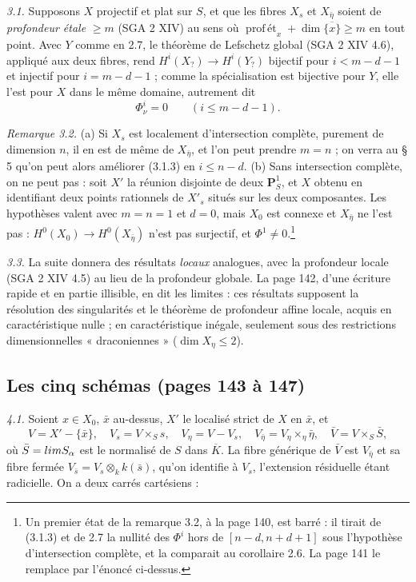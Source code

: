 \documentclass[11pt,a4paper]{article}
\begin{document}
\emph{3.1.} Supposons $X$ projectif et plat sur $S$, et que les fibres $X_s$ et
$X_{\bar\eta}$ soient de \emph{profondeur étale} $\geq m$ (SGA 2 XIV) au sens où
$\operatorname{prof\,ét}_x + \dim \overline{\{x\}} \geq m$ en tout point. Avec $Y$
comme en 2.7, le théorème de Lefschetz global (SGA 2 XIV 4.6), appliqué aux deux
fibres, rend $H^i(X_?) \to H^i(Y_?)$ bijectif pour $i < m - d - 1$ et injectif
pour $i = m - d - 1$ ; comme la spécialisation est bijective pour $Y$, elle
l'est pour $X$ dans le même domaine, autrement dit
\[
  \Phi^i_\nu = 0 \qquad (i \leq m - d - 1) . \tag{3.1.3}
\]

\emph{Remarque 3.2.} (a) Si $X_s$ est localement d'intersection complète,
purement de dimension $n$, il en est de même de $X_{\bar\eta}$, et l'on peut
prendre $m = n$ ; on verra au § 5 qu'on peut alors améliorer (3.1.3) en
$i \leq n - d$. (b) Sans intersection complète, on ne peut pas : soit $X'$ la
réunion disjointe de deux $\mathbf{P}^1_S$, et $X$ obtenu en identifiant deux
points rationnels de $X'_s$ situés sur les deux composantes. Les hypothèses
valent avec $m = n = 1$ et $d = 0$, mais $X_0$ est connexe et $X_{\bar\eta}$ ne
l'est pas : $H^0(X_0) \to H^0(X_{\bar\eta})$ n'est pas surjectif, et
$\Phi^1 \neq 0$.\footnote{Un premier état de la remarque 3.2, à la page 140, est
barré : il tirait de (3.1.3) et de 2.7 la nullité des $\Phi^i$ hors de
$[n-d, n+d+1]$ sous l'hypothèse d'intersection complète, et la comparait au
corollaire 2.6. La page 141 le remplace par l'énoncé ci-dessus.}

\emph{3.3.} La suite donnera des résultats \emph{locaux} analogues, avec la
profondeur locale (SGA 2 XIV 4.5) au lieu de la profondeur globale. La page 142,
d'une écriture rapide et en partie illisible, en dit les limites : ces résultats
supposent la résolution des singularités et le théorème de profondeur affine
locale, acquis en caractéristique nulle ; en caractéristique inégale, seulement
sous des restrictions dimensionnelles « draconiennes » ($\dim X_\eta \leq 2$).

\subsection*{Les cinq schémas (pages 143 à 147)}

\emph{4.1.} Soient $x \in X_0$, $\bar x$ au-dessus, $X'$ le localisé strict de
$X$ en $\bar x$, et
\[
  V = X' - \{\bar x\}, \quad V_s = V \times_S s, \quad V_\eta = V - V_s, \quad
  V_{\bar\eta} = V_\eta \times_\eta \bar\eta, \quad
  \bar V = V \times_S \bar S ,
\]
où $\bar S = \varprojlim S_\alpha$ est le normalisé de $S$ dans $\overline K$. La
fibre générique de $\bar V$ est $V_{\bar\eta}$ et sa fibre fermée
$V_{\bar s} = V_s \otimes_k k(\bar s)$, qu'on identifie à $V_s$, l'extension
résiduelle étant radicielle. On a deux carrés cartésiens :
\end{document}
